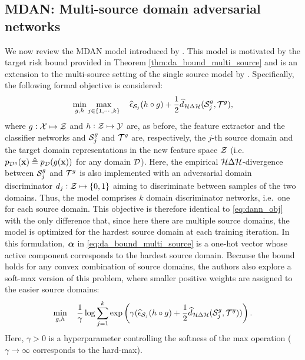 \subsection{MDAN: Multi-source domain adversarial networks}
\label{sec:da_sensors_mdan}
We now review the MDAN model introduced by \citet{Zhao2018}. This model is motivated by the target risk bound provided in Theorem \ref{thm:da_bound_multi_source} and is an extension to the multi-source setting of the single source model by \citet{Ganin2015}. Specifically, the following formal objective is considered:
\begin{equation}
	\min_{g,h} \max_{j \in \{1,\cdots,k\}} \quad \widehat{\epsilon}_{{\mathcal{S}}_j}(h \circ g) + \frac{1}{2} \widehat{d}_{{\mathcal{H}} \Delta {\mathcal{H}}}({\mathcal{S}}^g_j, {\mathcal{T}}^g),
\end{equation}
where $g: {\mathcal{X}} \mapsto {\mathcal{Z}}$ and $h: {\mathcal{Z}} \mapsto {\mathcal{Y}}$ are, as before, the feature extractor and the classifier networks and ${\mathcal{S}}^g_j$ and ${\mathcal{T}}^g$ are, respectively, the $j$-th source domain and the target domain representations in the new feature space ${\mathcal{Z}}$ (i.e.\ $p_{{\mathcal{D}}^g}({\mathbf{x}}) \triangleq p_{\mathcal{D}}(g({\mathbf{x}}))$ for any domain ${\mathcal{D}}$). Here, the empirical ${\mathcal{H}} \Delta {\mathcal{H}}$-divergence between ${\mathcal{S}}^g_j$ and ${\mathcal{T}}^g$ is also implemented with an adversarial domain discriminator $d_j:{\mathcal{Z}} \mapsto \{0,1\}$ aiming to discriminate between samples of the two domains. Thus, the model comprises $k$ domain discriminator networks, i.e.\ one for each source domain. This objective is therefore identical to \eqref{eq:dann_obj} with the only difference that, since here there are multiple source domains, the model is optimized for the hardest source domain at each training iteration. In this formulation, ${\bm{\alpha}}$ in \eqref{eq:da_bound_multi_source} is a one-hot vector whose active component corresponds to the hardest source domain. Because the bound holds for any convex combination of source domains, the authors also explore a soft-max version of this problem, where smaller positive weights are assigned to the easier source domains:
\begin{equation}
\min_{g,h} \quad \frac{1}{\gamma} \log \sum_{j=1}^{k} \exp \left( \gamma( \widehat{\epsilon}_{{\mathcal{S}}_j}(h \circ g) + \frac{1}{2} \widehat{d}_{{\mathcal{H}} \Delta {\mathcal{H}}}({\mathcal{S}}^g_j, {\mathcal{T}}^g)) \right).
\end{equation}
Here, $\gamma > 0$ is a hyperparameter controlling the softness of the max operation ($\gamma \to \infty$ corresponds to the hard-max).

